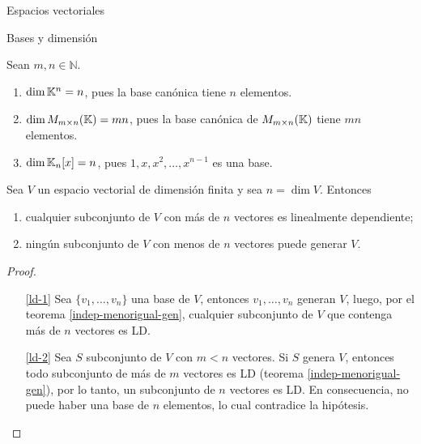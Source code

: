 \begin{chapter}{Espacios vectoriales}
\begin{section}{Bases y dimensi\'on}
\begin{ejemplo*} Sean $m,n \in \mathbb N$. 
    \begin{enumerate}
        \item $\dim \mathbb K^n= n$, pues  la base canónica tiene $n$ elementos.
        \item $\dim M_{m \times n}(\mathbb K) = mn$, pues la base canónica de $M_{m \times n}(\mathbb K)$ tiene $mn$  elementos.  
        \item $\dim \mathbb K_n[x] =n$, pues $1,x,x^2,\ldots,x^{n-1}$ es una base.   
    \end{enumerate}
\end{ejemplo*}
        
        
        \begin{corolario}
            Sea $V$ un espacio vectorial de dimensión finita y sea $n = \dim V$. 
            Entonces
            \begin{enumerate}
                \item\label{ld-1} cualquier subconjunto de $V$ con más de $n$ vectores es linealmente
                dependiente;
                \item\label{ld-2} ningún subconjunto de $V$ con menos de $n$ vectores puede generar $V$.
            \end{enumerate} 
        \end{corolario}
    \begin{proof}

        \
        
        \begin{enumerate}
            \item[\ref{ld-1}] Sea $\{v_1,\ldots,v_n\}$ una base de $V$, entonces $v_1,\ldots,v_n$ generan $V$, luego, por el teorema \ref{indep-menorigual-gen}, cualquier subconjunto de $V$ que contenga más de $n$ vectores es LD.
            \item[\ref{ld-2}] Sea $S$  subconjunto de $V$ con $m < n$ vectores. Si $S$  genera $V$,  entonces todo subconjunto de más de $m$  vectores es LD (teorema \ref{indep-menorigual-gen}), por lo tanto, un subconjunto de $n$ vectores es LD. En  consecuencia, no puede haber una base de $n$  elementos, lo cual contradice la hipótesis.
        \end{enumerate} 
    \end{proof}


\end{section}
\end{chapter}
